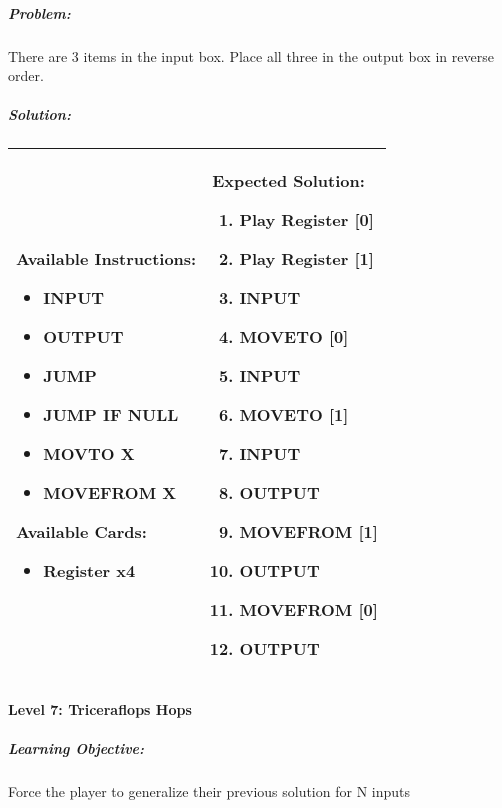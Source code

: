 \subparagraph{Problem:} There are 3 items in the input box. Place all three in the output box in reverse order.

\subparagraph{Solution:} 
\begin{center}
    \begin{tabular}{ | m{5cm} | m{9cm} | } 
        \hline
            \textbf{Available Instructions:} 
            \begin{itemize}
                \setlength\itemsep{-.35em}
                \item INPUT
                \item OUTPUT
                \item JUMP
                \item JUMP IF NULL
                \item MOVTO X
                \item MOVEFROM X
            \end{itemize}
            \textbf{Available Cards:} 
            \begin{itemize}
                \setlength\itemsep{-.35em}
                \item Register x4
            \end{itemize}& 
            \textbf{Expected Solution:} 
            \begin{enumerate}
                \setlength\itemsep{-.35em}
                \item Play Register [0]
                \item Play Register [1]
                \item INPUT
                \item MOVETO [0]
                \item INPUT
                \item MOVETO [1]
                \item INPUT
                \item OUTPUT
                \item MOVEFROM [1] 
                \item OUTPUT
                \item MOVEFROM [0] 
                \item OUTPUT
            \end{enumerate}
            \\
        \hline
    \end{tabular}
\end{center}

\paragraph{Level 7: Triceraflops Hops}
\subparagraph{Learning Objective:} Force the player to generalize their previous solution for N inputs

